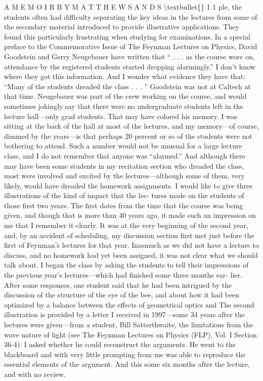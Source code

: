 \documentclass[10pt,oneside]{article}
\begin{document}
A  M E M O I R  B Y  M A T T H E W  S A N D S \textbackslash{}textbullet\{\} 1 1 ple, the students often had difficulty separating the key ideas in the lectures from some of the secondary material introduced to provide illustrative applications. They found this particularly frustrating when studying for examinations. In a special preface to the Commemorative Issue of The Feynman Lectures on Physics, David Goodstein and Gerry Neugebauer have written that “ . . . as the course wore on, attendance by the registered students started dropping alarmingly.” I don’t know where they got this information. And I wonder what evidence they have that: “Many of the students dreaded the class . . . ” Goodstein was not at Caltech at that time. Neugebauer was part of the crew working on the course, and would sometimes jokingly say that there were no undergraduate students left in the lecture hall---only grad students. That may have colored his memory. I was sitting at the back of the hall at most of the lectures, and my memory---of course, dimmed by the years---is that perhaps 20 percent or so of the students were not bothering to attend. Such a number would not be unusual for a large lecture class, and I do not remember that anyone was “alarmed.” And although there may have been some students in my recitation section who dreaded the class, most were involved and excited by the lectures---although some of them, very likely, would have dreaded the homework assignments. I would like to give three illustrations of the kind of impact that the lec- tures made on the students of those first two years. The first dates from the time that the course was being given, and though that is more than 40 years ago, it made such an impression on me that I remember it clearly. It was at the very beginning of the second year, and, by an accident of scheduling, my discussion section first met just before the first of Feynman’s lectures for that year. Inasmuch as we did not have a lecture to discuss, and no homework had yet been assigned, it was not clear what we should talk about. I began the class by asking the students to tell their impressions of the previous year’s lectures---which had finished some three months ear- lier. After some responses, one student said that he had been intrigued by the discussion of the structure of the eye of the bee, and about how it had been optimized by a balance between the effects of geometrical optics and The second illustration is provided by a letter I received in 1997---some 34 years after the lectures were given---from a student, Bill Satterthwaite, the limitations from the wave nature of light (see The Feynman Lectures on Physics (FLP), Vol. I Section 36-4). I asked whether he could reconstruct the arguments. He went to the blackboard and with very little prompting from me was able to reproduce the essential elements of the argument. And this some six months after the lecture, and with no review.\par
\end{document}
